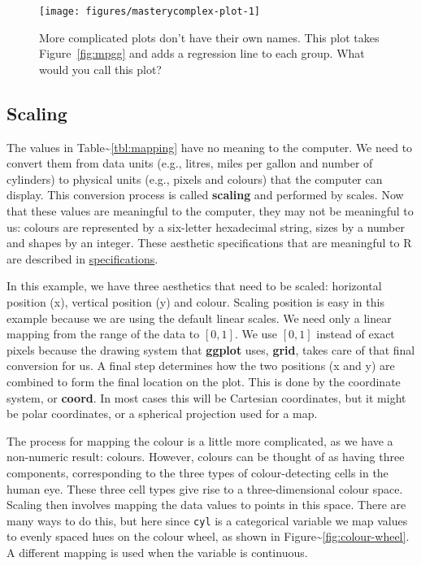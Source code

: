 \begin{figure}
\texttt{[image: figures/masterycomplex-plot-1]} \caption{More complicated plots don't have their own names. This plot takes Figure~\ref{fig:mpgg} and adds a regression line to each group. What would you call this plot?\label{fig:complex-plot}}
\end{figure}

\subsection{Scaling}

The values in Table\textasciitilde{}\ref{tbl:mapping} have no meaning to
the computer. We need to convert them from data units (e.g., litres,
miles per gallon and number of cylinders) to physical units (e.g.,
pixels and colours) that the computer can display. This conversion
process is called \textbf{scaling} and performed by scales. Now that
these values are meaningful to the computer, they may not be meaningful
to us: colours are represented by a six-letter hexadecimal string, sizes
by a number and shapes by an integer. These aesthetic specifications
that are meaningful to R are described in
\hyperref[cha:specifications]{specifications}.

In this example, we have three aesthetics that need to be scaled:
horizontal position (x), vertical position (y) and colour. Scaling
position is easy in this example because we are using the default linear
scales. We need only a linear mapping from the range of the data to
\([0, 1]\). We use \([0, 1]\) instead of exact pixels because the
drawing system that \textbf{ggplot} uses, \textbf{grid}, takes care of
that final conversion for us. A final step determines how the two
positions (x and y) are combined to form the final location on the plot.
This is done by the coordinate system, or \textbf{coord}. In most cases
this will be Cartesian coordinates, but it might be polar coordinates,
or a spherical projection used for a map.

The process for mapping the colour is a little more complicated, as we
have a non-numeric result: colours. However, colours can be thought of
as having three components, corresponding to the three types of
colour-detecting cells in the human eye. These three cell types give
rise to a three-dimensional colour space. Scaling then involves mapping
the data values to points in this space. There are many ways to do this,
but here since \texttt{cyl} is a categorical variable we map values to
evenly spaced hues on the colour wheel, as shown in
Figure\textasciitilde{}\ref{fig:colour-wheel}. A different mapping is
used when the variable is continuous. 


